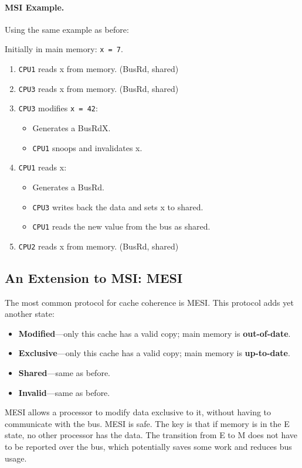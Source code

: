 \paragraph{MSI Example.} Using the same example as before:

Initially in main memory: {\tt x = 7}.

  \begin{enumerate}
    \item {\tt CPU1} reads x from memory. {(BusRd, shared)}
    \item {\tt CPU3} reads x from memory. {(BusRd, shared)}
    \item {\tt CPU3} modifies {\tt x = 42}:
      \begin{itemize}
        \item {Generates a BusRdX.}
        \item {{\tt CPU1} snoops and invalidates x.}
      \end{itemize}
    \item {\tt CPU1} reads x:
      \begin{itemize}
        \item {Generates a BusRd.}
        \item {{\tt CPU3} writes back the data and sets x to shared.}
        \item {{\tt CPU1} reads the new value from the bus as shared.}
      \end{itemize}
    \item {\tt CPU2} reads x from memory. {(BusRd, shared)}
  \end{enumerate}

\subsection*{An Extension to MSI: MESI}
    The most common protocol for cache coherence is MESI.
    This protocol adds yet another state:
      \begin{itemize}
        \item {\bf Modified}---only this cache has a valid copy; 
 main memory is {\bf out-of-date}.
        \item {\bf Exclusive}---only this cache has a valid copy; 
 main memory is {\bf up-to-date}.
        \item {\bf Shared}---same as before.
        \item {\bf Invalid}---same as before.
      \end{itemize}

    MESI allows a processor to modify data exclusive to it, without
    having to communicate with the bus.  MESI is safe. The key is that
    if memory is in the E state, no other processor has the data. The transition from E to M does not have to be reported over the bus, which potentially saves some work and reduces bus usage. 

